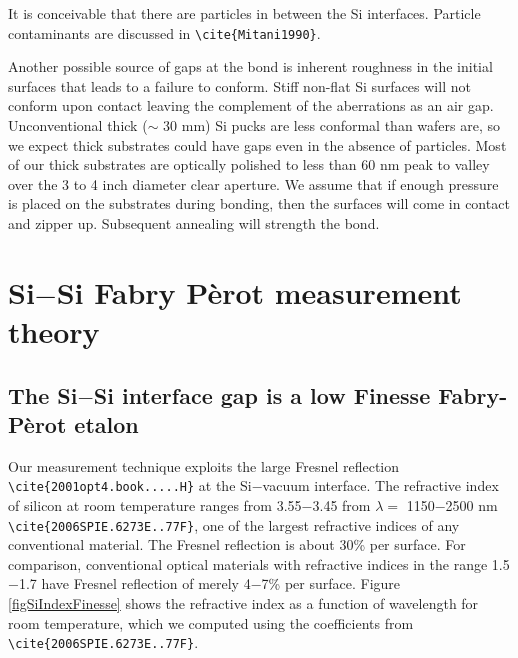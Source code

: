 \documentclass[osajnl,preprint,showpacs,superscriptaddress,12pt]{revtex4-1} %
\begin{document}
It is conceivable that there are particles in between the Si interfaces.  Particle contaminants are discussed in \verb|\cite{Mitani1990}|.

Another possible source of gaps at the bond is inherent roughness in the initial surfaces that leads to a failure to conform.  Stiff non-flat Si surfaces will not conform upon contact leaving the complement of the aberrations as an air gap. Unconventional thick ($\sim$ 30 mm) Si pucks are less conformal than wafers are, so we expect thick substrates could have gaps even in the absence of particles.  Most of our thick substrates are optically polished to less than 60 nm peak to valley over the 3 to 4 inch diameter clear aperture.  We assume that if enough pressure is placed on the substrates during bonding, then the surfaces will come in contact and zipper up.  Subsequent annealing will strength the bond.

\section{Si$-$Si Fabry P\`{e}rot measurement theory}
\label{secTheory}

\subsection{The Si$-$Si interface gap is a low Finesse Fabry-P\`{e}rot etalon}

Our measurement technique exploits the large Fresnel reflection \verb|\cite{2001opt4.book.....H}| at the Si$-$vacuum interface.  The refractive index of silicon at room temperature ranges from 3.55$-$3.45 from $\lambda = $ 1150$-$2500 nm \verb|\cite{2006SPIE.6273E..77F}|, one of the largest refractive indices of any conventional material.  The Fresnel reflection is about 30\% per surface.  For comparison, conventional optical materials with refractive indices in the range 1.5$-$1.7 have Fresnel reflection of merely 4$-$7\% per surface.  Figure \ref{figSiIndexFinesse} shows the refractive index as a function of wavelength for room temperature, which we computed using the coefficients from \verb|\cite{2006SPIE.6273E..77F}|.
\end{document}
